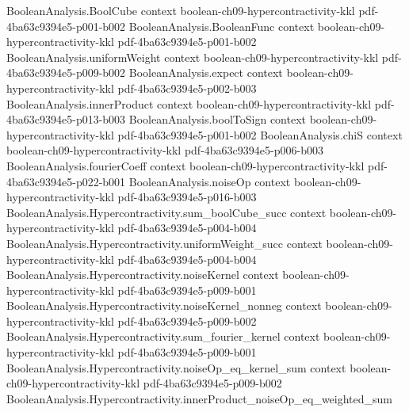 \begin{lemma}
\label{BooleanAnalysis.Hypercontractivity.two_func_hyp_succ}
\leanok
{}
\proofstep
  {BooleanAnalysis.BoolCube}
  {context}
  {boolean-ch09-hypercontractivity-kkl}
  {pdf-4ba63c9394e5-p001-b002}
\proofstep
  {BooleanAnalysis.BooleanFunc}
  {context}
  {boolean-ch09-hypercontractivity-kkl}
  {pdf-4ba63c9394e5-p001-b002}
\proofstep
  {BooleanAnalysis.uniformWeight}
  {context}
  {boolean-ch09-hypercontractivity-kkl}
  {pdf-4ba63c9394e5-p009-b002}
\proofstep
  {BooleanAnalysis.expect}
  {context}
  {boolean-ch09-hypercontractivity-kkl}
  {pdf-4ba63c9394e5-p002-b003}
\proofstep
  {BooleanAnalysis.innerProduct}
  {context}
  {boolean-ch09-hypercontractivity-kkl}
  {pdf-4ba63c9394e5-p013-b003}
\proofstep
  {BooleanAnalysis.boolToSign}
  {context}
  {boolean-ch09-hypercontractivity-kkl}
  {pdf-4ba63c9394e5-p001-b002}
\proofstep
  {BooleanAnalysis.chiS}
  {context}
  {boolean-ch09-hypercontractivity-kkl}
  {pdf-4ba63c9394e5-p006-b003}
\proofstep
  {BooleanAnalysis.fourierCoeff}
  {context}
  {boolean-ch09-hypercontractivity-kkl}
  {pdf-4ba63c9394e5-p022-b001}
\proofstep
  {BooleanAnalysis.noiseOp}
  {context}
  {boolean-ch09-hypercontractivity-kkl}
  {pdf-4ba63c9394e5-p016-b003}
\proofstep
  {BooleanAnalysis.Hypercontractivity.sum_boolCube_succ}
  {context}
  {boolean-ch09-hypercontractivity-kkl}
  {pdf-4ba63c9394e5-p004-b004}
\proofstep
  {BooleanAnalysis.Hypercontractivity.uniformWeight_succ}
  {context}
  {boolean-ch09-hypercontractivity-kkl}
  {pdf-4ba63c9394e5-p004-b004}
\proofstep
  {BooleanAnalysis.Hypercontractivity.noiseKernel}
  {context}
  {boolean-ch09-hypercontractivity-kkl}
  {pdf-4ba63c9394e5-p009-b001}
\proofstep
  {BooleanAnalysis.Hypercontractivity.noiseKernel_nonneg}
  {context}
  {boolean-ch09-hypercontractivity-kkl}
  {pdf-4ba63c9394e5-p009-b002}
\proofstep
  {BooleanAnalysis.Hypercontractivity.sum_fourier_kernel}
  {context}
  {boolean-ch09-hypercontractivity-kkl}
  {pdf-4ba63c9394e5-p009-b001}
\proofstep
  {BooleanAnalysis.Hypercontractivity.noiseOp_eq_kernel_sum}
  {context}
  {boolean-ch09-hypercontractivity-kkl}
  {pdf-4ba63c9394e5-p009-b002}
\proofstep
  {BooleanAnalysis.Hypercontractivity.innerProduct_noiseOp_eq_weighted_sum}

\end{lemma}
